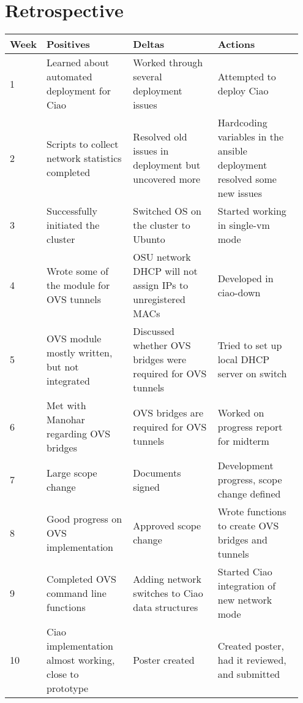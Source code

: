 \documentclass[10pt,onecolumn,journal,draftclsnofoot]{IEEEtran}
\begin{document}
\section{Retrospective}

\begin{center}
	\begin{tabular}{| p{0.05\linewidth} | p{0.3\linewidth} | p{0.3\linewidth} |
			p{0.3\linewidth} |}\hline
		Week & Positives & Deltas & Actions \\ \hline

		1 & Learned about automated deployment for Ciao & Worked through
		several deployment issues & Attempted to deploy Ciao \\ \hline

		2 & Scripts to collect network statistics completed & Resolved
		old issues in deployment but uncovered more & Hardcoding
		variables in the ansible deployment resolved some new issues \\
		\hline

		3 & Successfully initiated the cluster & Switched OS on the
		cluster to Ubunto & Started working in single-vm mode \\ \hline

		4 & Wrote some of the module for OVS tunnels & OSU network DHCP
		will not assign IPs to unregistered MACs & Developed in
		ciao-down \\ \hline

		5 & OVS module mostly written, but not integrated & Discussed
		whether OVS bridges were required for OVS tunnels & Tried to set
		up local DHCP server on switch \\ \hline

		6 & Met with Manohar regarding OVS bridges & OVS bridges are
		required for OVS tunnels & Worked on progress report for midterm
		\\ \hline

		7 & Large scope change & Documents signed & Development progress,
		scope change defined\\ \hline

		8 & Good progress on OVS implementation & Approved scope change
		& Wrote functions to create OVS bridges and tunnels\\ \hline

		9 & Completed OVS command line functions & Adding network switches
		to Ciao data structures & Started Ciao integration
		of new network mode\\ \hline

		10 & Ciao implementation almost working, close to prototype & 
		Poster created & Created poster, had it reviewed, and submitted\\ \hline

	\end{tabular}
\end{center}



\end{document}
